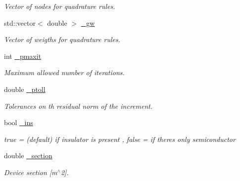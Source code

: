 \begin{DoxyCompactItemize}
\begin{DoxyCompactList}\small\item\em Vector of nodes for quadrature rules. \end{DoxyCompactList}\item 
\mbox{\label{class_probl_a7bd984626a448c6c78f56e1f1dad7920}} 
std\+::vector$<$ double $>$ \mbox{\hyperlink{class_probl_a7bd984626a448c6c78f56e1f1dad7920}{\+\_\+gw}}
\begin{DoxyCompactList}\small\item\em Vector of weigths for quadrature rules. \end{DoxyCompactList}\item 
\mbox{\label{class_probl_a2c908e7f736afa1ae46b65a06d8cde65}} 
int \mbox{\hyperlink{class_probl_a2c908e7f736afa1ae46b65a06d8cde65}{\+\_\+pmaxit}}
\begin{DoxyCompactList}\small\item\em Maximum allowed number of iterations. \end{DoxyCompactList}\item 
\mbox{\label{class_probl_a3ffc65598e43d2f3544ebb5ca3d30370}} 
double \mbox{\hyperlink{class_probl_a3ffc65598e43d2f3544ebb5ca3d30370}{\+\_\+ptoll}}
\begin{DoxyCompactList}\small\item\em Tolerances on th residual norm of the increment. \end{DoxyCompactList}\item 
\mbox{\label{class_probl_a4d865364c4f14de03a29c80b5f17c13a}} 
bool \mbox{\hyperlink{class_probl_a4d865364c4f14de03a29c80b5f17c13a}{\+\_\+ins}}
\begin{DoxyCompactList}\small\item\em true = (default) if insulator is present , false = if there\textquotesingle{}s only semiconductor \end{DoxyCompactList}\item 
\mbox{\label{class_probl_a53abc767656e3839d81da3c3871a4bad}} 
double \mbox{\hyperlink{class_probl_a53abc767656e3839d81da3c3871a4bad}{\+\_\+section}}
\begin{DoxyCompactList}\small\item\em Device section \mbox{[}m$^\wedge$2\mbox{]}. \end{DoxyCompactList}\item 

\end{DoxyCompactItemize}

